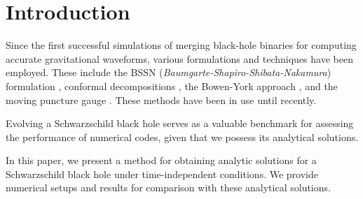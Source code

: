 \documentclass[%
 reprint,
 amsmath,amssymb,
 aps,
 prd,
]{revtex4-2}
\begin{document}
\maketitle


%
%

\section{Introduction}
Since the first successful simulations of merging black-hole binaries for computing accurate gravitational waveforms, various formulations and techniques have been employed. These include the BSSN (\textit{Baumgarte-Shapiro-Shibata-Nakamura}) formulation \cite{Nakamura:1987, Shibata:1995we, Baumgarte:1998te}, conformal decompositions \cite{PhysRevLett.26.1656, Lichnerowicz:1944zz}, the Bowen-York approach \cite{Bowen:1980yu}, and the moving puncture gauge \cite{PhysRevD.77.024027}. These methods have been in use until recently.

Evolving a Schwarzschild black hole serves as a valuable benchmark for assessing the performance of numerical codes, given that we possess its analytical solutions.

In this paper, we present a method for obtaining analytic solutions for a Schwarzschild black hole under time-independent conditions. We provide numerical setups and results for comparison with these analytical solutions.
\end{document}
